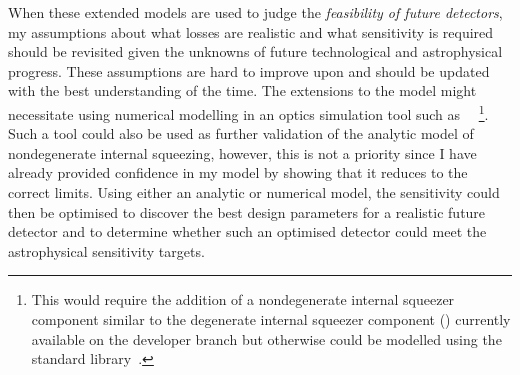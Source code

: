 When these extended models are used to judge the \emph{feasibility of future detectors}, my assumptions about what losses are realistic and what sensitivity is required should be revisited given the unknowns of future technological and astrophysical progress. These assumptions are hard to improve upon and should be updated with the best understanding of the time.
The extensions to the model might necessitate using numerical modelling in an optics simulation tool such as ~\cite{finesse}~\footnote{This would require the addition of a nondegenerate internal squeezer component similar to the degenerate internal squeezer component () currently available on the  developer branch but otherwise could be modelled using the standard library~\cite{BROWN_PYKAT}.}. Such a tool could also be used as further validation of the analytic model of nondegenerate internal squeezing, however, this is not a priority since I have already provided confidence in my model by showing that it reduces to the correct limits. %
Using either an analytic or numerical model, the sensitivity could then be optimised to discover the best design parameters for a realistic future detector and to determine whether such an optimised detector could meet the astrophysical sensitivity targets. %


